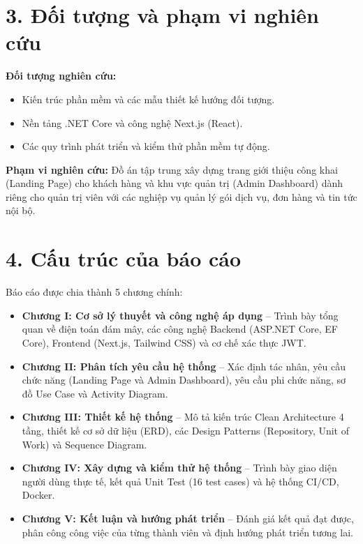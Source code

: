 \section*{3. Đối tượng và phạm vi nghiên cứu}
\textbf{Đối tượng nghiên cứu:}
\begin{itemize}
    \item Kiến trúc phần mềm và các mẫu thiết kế hướng đối tượng.
    \item Nền tảng .NET Core và công nghệ Next.js (React).
    \item Các quy trình phát triển và kiểm thử phần mềm tự động.
\end{itemize}
\textbf{Phạm vi nghiên cứu:} Đồ án tập trung xây dựng trang giới thiệu công khai (Landing Page) cho khách hàng và khu vực quản trị (Admin Dashboard) dành riêng cho quản trị viên với các nghiệp vụ quản lý gói dịch vụ, đơn hàng và tin tức nội bộ.

\section*{4. Cấu trúc của báo cáo}
Báo cáo được chia thành 5 chương chính:
\begin{itemize}
    \item \textbf{Chương I: Cơ sở lý thuyết và công nghệ áp dụng} -- Trình bày tổng quan về điện toán đám mây, các công nghệ Backend (ASP.NET Core, EF Core), Frontend (Next.js, Tailwind CSS) và cơ chế xác thực JWT.
    \item \textbf{Chương II: Phân tích yêu cầu hệ thống} -- Xác định tác nhân, yêu cầu chức năng (Landing Page và Admin Dashboard), yêu cầu phi chức năng, sơ đồ Use Case và Activity Diagram.
    \item \textbf{Chương III: Thiết kế hệ thống} -- Mô tả kiến trúc Clean Architecture 4 tầng, thiết kế cơ sở dữ liệu (ERD), các Design Patterns (Repository, Unit of Work) và Sequence Diagram.
    \item \textbf{Chương IV: Xây dựng và kiểm thử hệ thống} -- Trình bày giao diện người dùng thực tế, kết quả Unit Test (16 test cases) và hệ thống CI/CD, Docker.
    \item \textbf{Chương V: Kết luận và hướng phát triển} -- Đánh giá kết quả đạt được, phân công công việc của từng thành viên và định hướng phát triển tương lai.
\end{itemize}

